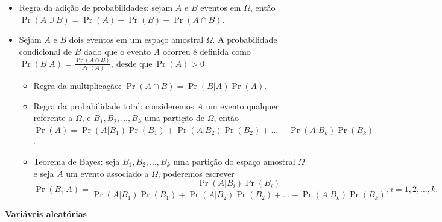 \documentclass[10pt]{article}%
\begin{document}
\begin{itemize}
\item Regra da adição de probabilidades: sejam $A$ e $B$ eventos em $\Omega$, então $\Pr(A\cup B) = \Pr(A) + \Pr(B) - \Pr(A\cap B)$.
\item Sejam $A$ e $B$ dois eventos em um espaço amostral $\Omega$. A probabilidade condicional de $B$ dado que o evento $A$ ocorreu é definida como $\Pr(B|A) = \frac{\Pr(A \cap B)}{\Pr(A)},\ \mbox{desde que}\ \Pr(A) > 0$.
\begin{itemize}
\item Regra da multiplicação: $\Pr(A \cap B) = \Pr(B|A)\Pr(A)$.
\item Regra da probabilidade total: consideremos $A$ um evento qualquer referente a $\Omega$, e $B_1, B_2, \ldots, B_k$ uma partição de $\Omega$, então $\Pr(A) = \Pr(A|B_1)\Pr(B_1) + \Pr(A|B_2)\Pr(B_2) + \ldots + \Pr(A|B_k)\Pr(B_k)$.
\item Teorema de Bayes: seja $B_1, B_2, \ldots, B_k$ uma partição do espaço amostral $\Omega$ e seja $A$ um evento associado a $\Omega$, poderemos escrever
$$
\Pr(B_i|A) = \frac{\Pr(A|B_i)\Pr(B_i)}{\Pr(A|B_1)\Pr(B_1) + \Pr(A|B_2)\Pr(B_2) + \ldots + \Pr(A|B_k)\Pr(B_k)}, i = 1, 2, \ldots, k.
$$
\end{itemize}
\end{itemize}


\textbf{Variáveis aleatórias}
\end{document}
